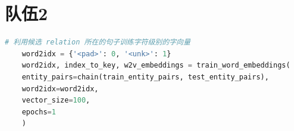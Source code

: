 \documentclass[a4paper]{article}
\begin{document}
%
%

\newpage
\appendix
\section{队伍2}
\begin{lstlisting}[language=python]
	# 利用候选 relation 所在的句子训练字符级别的字向量
	word2idx = {'<pad>': 0, '<unk>': 1}
	word2idx, index_to_key, w2v_embeddings = train_word_embeddings(
	entity_pairs=chain(train_entity_pairs, test_entity_pairs),
	word2idx=word2idx,
	vector_size=100,
	epochs=1
	)

\end{lstlisting}
\end{document}
